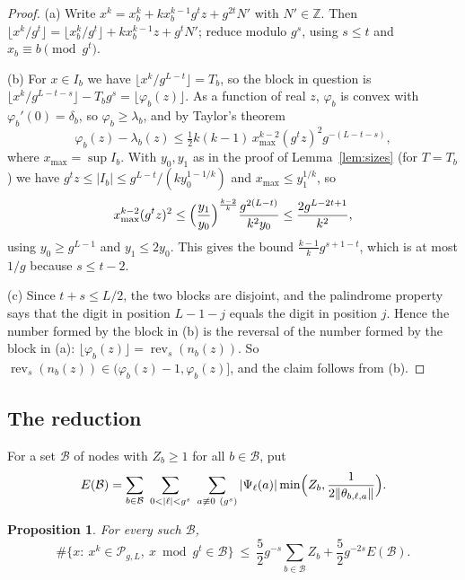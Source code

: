 \documentclass[11pt]{amsart}
\newtheorem{proposition}[theorem]{Proposition}
\theoremstyle{definition}
\numberwithin{equation}{section}
\newcommand{\cP}{\mathcal{P}}
\newcommand{\cB}{\mathcal{B}}
\newcommand{\rev}{\operatorname{rev}}
\newcommand{\Z}{\mathbb{Z}}
\begin{document}
\begin{proof}
(a) Write $x^k=x_b^k+kx_b^{k-1}g^tz+g^{2t}N'$ with $N'\in\Z$. Then
$\lfloor x^k/g^t\rfloor=\lfloor x_b^k/g^t\rfloor+kx_b^{k-1}z+g^tN'$; reduce modulo
$g^s$, using $s\le t$ and $x_b\equiv b\pmod{g^t}$.

(b) For $x\in I_b$ we have $\lfloor x^k/g^{L-t}\rfloor=T_b$, so the block in
question is $\lfloor x^k/g^{L-t-s}\rfloor-T_bg^s=\lfloor\varphi_b(z)\rfloor$. As a
function of real $z$, $\varphi_b$ is convex with $\varphi_b'(0)=\delta_b$, so
$\varphi_b\ge\lambda_b$, and by Taylor's theorem
\[
\varphi_b(z)-\lambda_b(z)\le\tfrac12k(k-1)\,x_{\max}^{k-2}(g^tz)^2g^{-(L-t-s)},
\]
where $x_{\max}=\sup I_b$. With $y_0,y_1$ as in the proof of
Lemma~\ref{lem:sizes} (for $T=T_b$) we have $g^tz\le|I_b|\le g^{L-t}/(ky_0^{1-1/k})$
and $x_{\max}\le y_1^{1/k}$, so
\[
x_{\max}^{k-2}(g^tz)^2\le\Bigl(\frac{y_1}{y_0}\Bigr)^{\frac{k-2}k}\frac{g^{2(L-t)}}{k^2y_0}\le\frac{2g^{L-2t+1}}{k^2},
\]
using $y_0\ge g^{L-1}$ and $y_1\le2y_0$. This gives the bound
$\frac{k-1}kg^{s+1-t}$, which is at most $1/g$ because $s\le t-2$.

(c) Since $t+s\le L/2$, the two blocks are disjoint, and the palindrome
property says that the digit in position $L-1-j$ equals the digit in
position $j$. Hence the number formed by the block in (b) is the reversal of
the number formed by the block in (a): $\lfloor\varphi_b(z)\rfloor=\rev_s(n_b(z))$.
So $\rev_s(n_b(z))\in(\varphi_b(z)-1,\varphi_b(z)]$, and the claim follows
from (b).
\end{proof}

\subsection{The reduction}
For a set $\cB$ of nodes with $Z_b\ge1$ for all $b\in\cB$, put
\[
E(\cB)=\sum_{b\in\cB}\ \sum_{0<|\ell|<g^s}\ \sum_{a\not\equiv0\ (g^s)}|\Psi_\ell(a)|\min\Bigl(Z_b,\frac1{2\|\theta_{b,\ell,a}\|}\Bigr).
\]

\begin{proposition}\label{prop:red}
For every such $\cB$,
\[
\#\{x:\ x^k\in\cP_{g,L},\ x\bmod g^t\in\cB\}\ \le\ \frac52g^{-s}\sum_{b\in\cB}Z_b+\frac52g^{-2s}E(\cB).
\]
\end{proposition}
\end{document}
